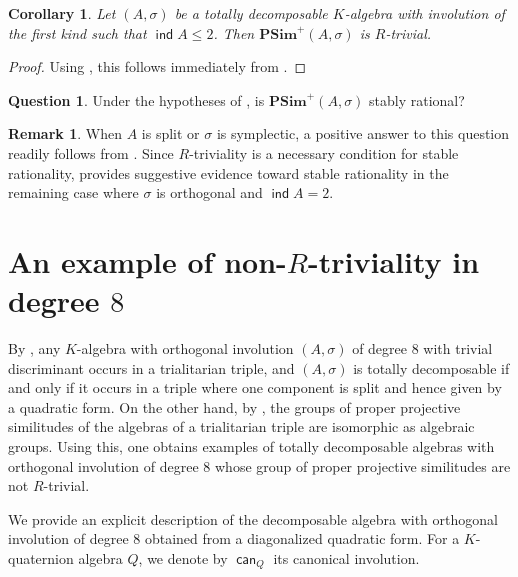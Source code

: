 \documentclass[twoside,11pt]{amsart}
\numberwithin{equation}{section}
\newtheorem{cor}[equation]{Corollary}
\theoremstyle{definition}
\newtheorem{qu}[equation]{Question}
\newtheorem{rem}[equation]{Remark}
\newcommand\ind{\operatorname{\mathsf{ind}}}
\newcommand{\can}{\operatorname{\mathsf{can}}}
\newcommand{\s}{\sigma}
\renewcommand{\leq}{\leqslant}
\begin{document}
\begin{cor}\label{main}   
Let $(A,\sigma)$ be a totally decomposable $K$-algebra with involution of the first kind such that $\ind A\leq 2$. Then $\mathbf{PSim}^+(A,\s)$ is $R$-trivial. 
\end{cor}
\begin{proof}
Using , this follows immediately from .
\end{proof}

\begin{qu}
Under the hypotheses of , is  $\mathbf{PSim}^+(A,\s)$ stably rational?
\end{qu}

\begin{rem}
When $A$ is split or $\s$ is symplectic, a positive answer to this question readily follows from \cite[Prop.~7]{Mer96}. 
Since $R$-triviality is a necessary condition for stable rationality,  provides suggestive evidence toward stable rationality in the remaining case where $\s$ is orthogonal and $\ind A=2$.
\end{rem}


\section{An example of non-\texorpdfstring{$R$}{R}-triviality in degree \texorpdfstring{$8$}{8}}
\label{S:examples}

By \cite[\S42]{KMRT98}, any $K$-algebra with orthogonal involution $(A,\s)$ of degree $8$ with trivial discriminant occurs in a trialitarian triple, and $(A,\s)$ is  totally decomposable if and only if it occurs in a triple where one component is split and hence given by a quadratic form.
On the other hand, by \cite[Prop.~42.5]{KMRT98}, the groups of proper projective similitudes of the algebras of a trialitarian triple are isomorphic as algebraic groups.
Using this, one obtains examples of totally decomposable algebras with orthogonal involution of degree $8$ whose group of proper projective similitudes are not $R$-trivial.

We provide an explicit description of the decomposable algebra with orthogonal involution of degree $8$ obtained from a diagonalized quadratic form.
For a $K$-quaternion algebra $Q$, we denote by $\can_Q$ its canonical involution.
\end{document}
